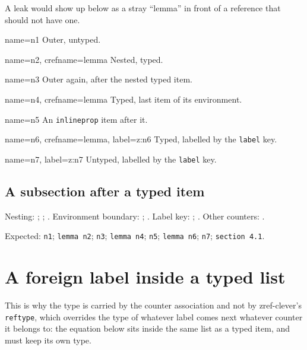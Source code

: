 \documentclass{article}
\begin{document}
A leak would show up below as a stray ``lemma'' in front of a reference that
should not have one.

\begin{prop}
  \item[name=n1] Outer, untyped. \label{z:n1}
  \begin{prop}
    \item[name=n2, crefname=lemma] Nested, typed. \label{z:n2}
  \end{prop}
  \item[name=n3] Outer again, after the nested typed item. \label{z:n3}
\end{prop}

\begin{prop}
  \item[name=n4, crefname=lemma] Typed, last item of its environment.
    \label{z:n4}
\end{prop}
\begin{inlineprop}
  \item[name=n5] An \texttt{inlineprop} item after it. \label{z:n5}
\end{inlineprop}

\begin{prop}
  \item[name=n6, crefname=lemma, label=z:n6] Typed, labelled by the
    \texttt{label} key.
  \item[name=n7, label=z:n7] Untyped, labelled by the \texttt{label} key.
\end{prop}

\subsection{A subsection after a typed item} \label{z:n8}

Nesting: ; ; .
Environment boundary: ; .
Label key: ; .
Other counters: .

Expected: \texttt{n1}; \texttt{lemma n2}; \texttt{n3}; \texttt{lemma n4};
\texttt{n5}; \texttt{lemma n6}; \texttt{n7}; \texttt{section 4.1}.

\section{A foreign label inside a typed list}

This is why the type is carried by the counter association and not by
zref-clever's \texttt{reftype}, which overrides the type of whatever label
comes next whatever counter it belongs to: the equation below sits inside the
same list as a typed item, and must keep its own type.
\end{document}
